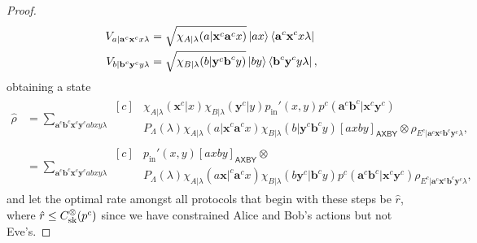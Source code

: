 \documentclass[10pt, a4paper]{article}
\numberwithin{equation}{section} %
\theoremstyle{definition}
\theoremstyle{plain}
\newcommand{\?}{\mathrel{?}} %
\newcommand{\cvec}[1]{\boldsymbol{\mathbf{#1}}}    %
\newcommand{\crv}[1]{\mathsf{#1}}
\newcommand{\proj}[2][]{{[#2]}_{#1}}
\newcommand{\prin}[1][p]{#1_{\mathrm{in}}}
\newcommand{\sk}{\rm sk}
\begin{document}
\begin{proof}
\begin{align*}
                   V_{a|\cvec{a}^c\cvec{x}^c x\lambda} &= \sqrt{\chi_{A|\lambda}(a|\cvec{x}^c\cvec{a}^cx)} \ket{ax}\bra{\cvec{a}^c\cvec{x}^c x\lambda} \\
                   V_{b|\cvec{b}^c\cvec{y}^c y\lambda} &= \sqrt{\chi_{B|\lambda}(b|\cvec{y}^c\cvec{b}^cy)} \ket{by}\bra{\cvec{b}^c\cvec{y}^c y\lambda},
                 \end{align*}
                 obtaining a state
                 \begin{align*}
                   \hat{\rho} &= \sum_{\cvec{a}^c\cvec{b}^c \cvec{x}^c\cvec{y}^c abxy\lambda} \begin{aligned}[c]
          & \chi_{A|\lambda}(\cvec{x}^c|x) \chi_{B|\lambda}(\cvec{y}^c|y) \prin'(x,y) p^c(\cvec{a}^c\cvec{b}^c|\cvec{x}^c\cvec{y}^c) \\
          & P_{\Lambda}(\lambda) \chi_{A|\lambda}(a|\cvec{x}^c\cvec{a}^cx) \chi_{B|\lambda}(b|\cvec{y}^c\cvec{b}^cy) \proj[\crv{AXBY}]{axby} \otimes \rho_{E^c|\cvec{a}^c\cvec{x}^c \cvec{b}^c\cvec{y}^c\lambda},
                   \end{aligned} \\
                              &= \sum_{\cvec{a}^c\cvec{b}^c \cvec{x}^c\cvec{y}^c abxy\lambda} \begin{aligned}[c]
          & \prin'(x,y) \proj[\crv{AXBY}]{axby} \otimes \\
          & P_{\Lambda}(\lambda)  \chi_{A|\lambda}(a\cvec{x}|^c\cvec{a}^cx) \chi_{B|\lambda}(b\cvec{y}^c|\cvec{b}^cy) p^c(\cvec{a}^c\cvec{b}^c|\cvec{x}^c\cvec{y}^c) \rho_{E^c|\cvec{a}^c\cvec{x}^c \cvec{b}^c\cvec{y}^c\lambda},
                   \end{aligned}
                 \end{align*}
                 and let the optimal rate amongst all protocols that begin with these steps be \(\hat{r}\), where \(\hat{r} \leq C_{\sk}^{\otimes}(p^c)\) since we have constrained Alice and Bob's actions but not Eve's.


\end{proof}
\end{document}

